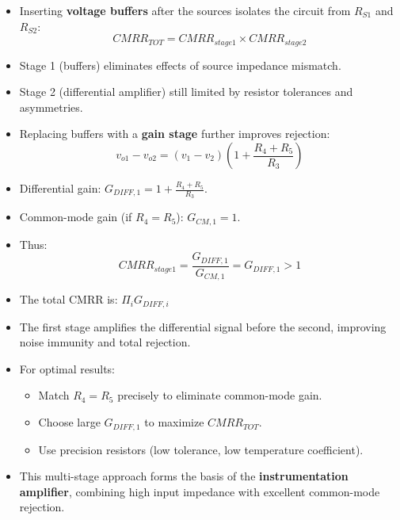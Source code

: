 \begin{tcolorbox}[colback=gray!10,colframe=black,title=Summary: Buffer-Based Improvement]
\begin{itemize}
    \item Inserting \textbf{voltage buffers} after the sources isolates the circuit from $R_{S1}$ and $R_{S2}$:
    \[
        CMRR_{TOT} = CMRR_{stage1} \times CMRR_{stage2}
    \]
    \item Stage 1 (buffers) eliminates effects of source impedance mismatch.
    \item Stage 2 (differential amplifier) still limited by resistor tolerances and asymmetries.
\end{itemize}
\end{tcolorbox}


\begin{tcolorbox}[colback=gray!10,colframe=black,title=Summary: Gain Stage for Enhanced CMRR]
\begin{itemize}
    \item Replacing buffers with a \textbf{gain stage} further improves rejection:
    \[
        v_{o1} - v_{o2} = (v_1 - v_2)\left(1 + \frac{R_4 + R_5}{R_3}\right)
    \]
    \item Differential gain: $\displaystyle G_{DIFF,1} = 1 + \frac{R_4 + R_5}{R_3}$.
    \item Common-mode gain (if $R_4 = R_5$): $\displaystyle G_{CM,1} = 1$.
    \item Thus:
    \[
        CMRR_{stage1} = \frac{G_{DIFF,1}}{G_{CM,1}} = G_{DIFF,1} > 1
    \]
\end{itemize}
\end{tcolorbox}


\begin{tcolorbox}[colback=gray!10,colframe=black,title=Summary: Overall Improvement and Design Insights]
\begin{itemize}
    \item The total CMRR is: $ \Pi_i G_{DIFF,i}$
    \item The first stage amplifies the differential signal before the second, improving noise immunity and total rejection.
    \item For optimal results:
    \begin{itemize}
        \item Match $R_4 = R_5$ precisely to eliminate common-mode gain.
        \item Choose large $G_{DIFF,1}$ to maximize $CMRR_{TOT}$.
        \item Use precision resistors (low tolerance, low temperature coefficient).
    \end{itemize}
    \item This multi-stage approach forms the basis of the \textbf{instrumentation amplifier}, combining high input impedance with excellent common-mode rejection.
\end{itemize}
\end{tcolorbox}
